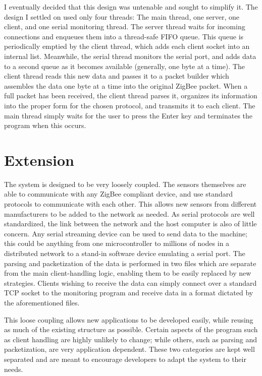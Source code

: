 \documentclass[a4paper,10pt]{article}
\begin{document}
I eventually decided that this design was untenable and sought to simplify
it. The design I settled on used only four threads: The main thread, one server,
one client, and one serial monitoring thread. The server thread waits for
incoming connections and enqueues them into a thread-safe FIFO queue. This queue
is periodically emptied by the client thread, which adds each client socket into
an internal list. Meanwhile, the serial thread monitors the serial port, and
adds data to a second queue as it becomes available (generally, one byte at a
time). The client thread reads this new data and passes it to a packet builder
which assembles the data one byte at a time into the original ZigBee
packet. When a full packet has been received, the client thread parses it,
organizes its information into the proper form for the chosen protocol, and
transmits it to each client. The main thread simply waits for the user to press
the Enter key and terminates the program when this occurs.

\section{Extension}
The system is designed to be very loosely coupled. The sensors themselves are
able to communicate with any ZigBee compliant device, and use standard protocols
to communicate with each other. This allows new sensors from different
manufacturers to be added to the network as needed. As serial protocols are well
standardized, the link between the network and the host computer is also of
little concern. Any serial streaming device can be used to send data to the
machine; this could be anything from one microcontroller to millions of nodes in
a distributed network to a stand-in software device emulating a serial port. The
parsing and packetization of the data is performed in two files which are
separate from the main client-handling logic, enabling them to be easily
replaced by new strategies. Clients wishing to receive the data can simply
connect over a standard TCP socket to the monitoring program and receive data in
a format dictated by the aforementioned files.

This loose coupling allows new applications to be developed easily, while
reusing as much of the existing structure as possible. Certain aspects of the
program such as client handling are highly unlikely to change; while others,
such as parsing and packetization, are very application dependent. These two
categories are kept well separated and are meant to encourage developers to
adapt the system to their needs.
\end{document}
